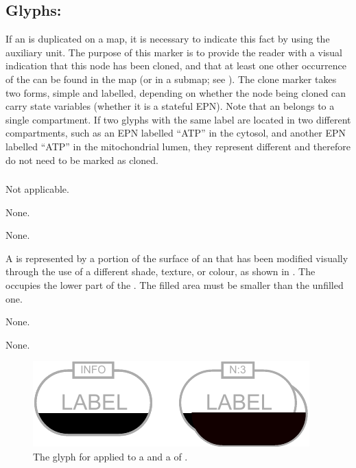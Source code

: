 \subsection{Glyphs: }
\label{sec:cloneMarker}

If an  is duplicated on a map, it is necessary to indicate this fact by using the  auxiliary unit.
The purpose of this marker is to provide the reader with a visual indication that this node has been cloned, and that at least one other occurrence of the  can be found in the map (or in a submap; see ).
The clone marker takes two forms, simple and labelled, depending on whether the node being cloned can carry state variables (\ie whether it is a stateful EPN).
Note that an  belongs to a single compartment.
If two glyphs with the same label are located in two different compartments, such as an EPN labelled ``ATP'' in the cytosol, and another EPN labelled ``ATP'' in the mitochondrial lumen, they represent different  and therefore do not need to be marked as cloned.

\subsubsection{}

\begin{glyphDescription}

\glyphSboTerm
Not applicable.

\glyphIncoming
None.

\glyphOutgoing
None.

\glyphContainer
A  is represented by a portion of the surface of an  that has been modified visually through the use of a different shade, texture, or colour, as shown in .
The  occupies the lower part of the .
The filled area must be smaller than the unfilled one.

\glyphLabel
None.

\glyphAux
None.

\end{glyphDescription}

\begin{figure}[H]
  \centering
  \includegraphics{images/build/simple_clone_marker.pdf}
  \caption{The \PD glyph for  applied to a  and a  of .}
  \label{fig:simpleCloneMarker}
\end{figure}

